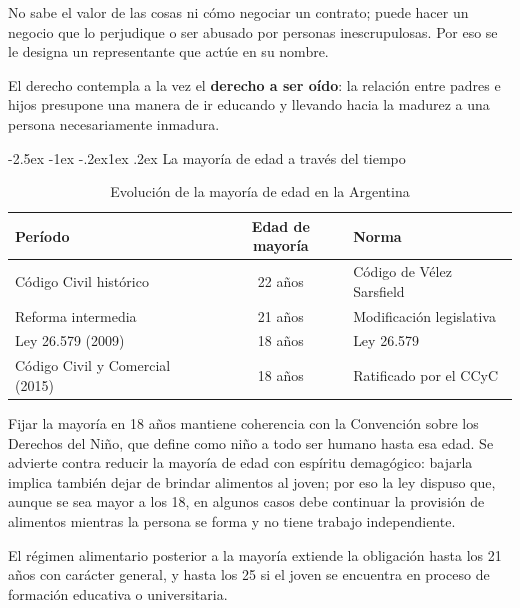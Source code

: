 \documentclass[12pt,oneside]{book}
\makeatletter
\renewcommand\subsection{\@startsection{subsection}{2}{\z@}%
  {-2.5ex \@plus -1ex \@minus -.2ex}{1ex \@plus .2ex}%
  {\normalfont\normalsize\bfseries}}
\makeatother
\begin{document}
\begin{ejemplo}
No sabe el valor de las cosas ni cómo negociar un contrato; puede hacer un negocio que lo perjudique o ser abusado por personas inescrupulosas. Por eso se le designa un representante que actúe en su nombre.
\end{ejemplo}

El derecho contempla a la vez el \textbf{derecho a ser oído}: la relación entre padres e hijos presupone una manera de ir educando y llevando hacia la madurez a una persona necesariamente inmadura.

\subsection{La mayoría de edad a través del tiempo}

\begin{table}[H]
\centering
\begin{tabularx}{\textwidth}{Y c Y}
\toprule
\textbf{Período} & \textbf{Edad de mayoría} & \textbf{Norma} \\
\midrule
Código Civil histórico & 22 años & Código de Vélez Sarsfield \\
Reforma intermedia & 21 años & Modificación legislativa \\
Ley 26.579 (2009) & 18 años & Ley 26.579 \\
Código Civil y Comercial (2015) & 18 años & Ratificado por el CCyC \\
\bottomrule
\end{tabularx}
\caption{Evolución de la mayoría de edad en la Argentina}
\end{table}

Fijar la mayoría en 18 años mantiene coherencia con la Convención sobre los Derechos del Niño, que define como niño a todo ser humano hasta esa edad. Se advierte contra reducir la mayoría de edad con espíritu demagógico: bajarla implica también dejar de brindar alimentos al joven; por eso la ley dispuso que, aunque se sea mayor a los 18, en algunos casos debe continuar la provisión de alimentos mientras la persona se forma y no tiene trabajo independiente.

\begin{nota}
El régimen alimentario posterior a la mayoría extiende la obligación hasta los 21 años con carácter general, y hasta los 25 si el joven se encuentra en proceso de formación educativa o universitaria.
\end{nota}
\end{document}
